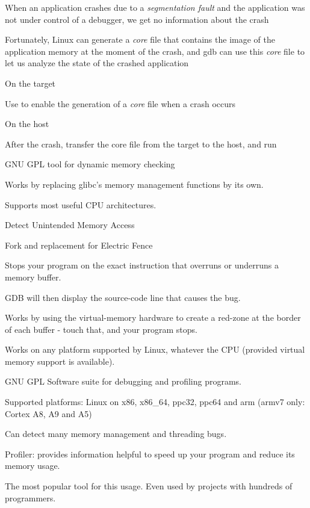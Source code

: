   \startitemize
  \item When an application crashes due to a {\em segmentation fault}
    and the application was not under control of a debugger, we get no
    information about the crash
  \item Fortunately, Linux can generate a {\em core} file that
    contains the image of the application memory at the moment of the
    crash, and gdb can use this {\em core} file to let us analyze the
    state of the crashed application
  \item On the target
    \startitemize
    \item Use  to enable the generation of a
      {\em core} file when a crash occurs
    \stopitemize
  \item On the host
    \startitemize
    \item After the crash, transfer the core file from the target to
      the host, and run
    \stopitemize
  \stopitemize


  \startitemize
  \item GNU GPL tool for dynamic memory checking
  \item Works by replacing glibc's memory management functions by its own.
  \item Supports most useful CPU architectures.
  \stopitemize

  Detect Unintended Memory Access\\
  \startitemize
  \item Fork and replacement for Electric Fence
  \item Stops your program on the exact instruction that overruns or
    underruns a  memory buffer.
  \item GDB will then display the source-code line that causes the
    bug.
  \item Works by using the virtual-memory hardware to create a
    red-zone at the border of each buffer - touch that, and your
    program stops.
  \item Works on any platform supported by Linux, whatever the CPU
    (provided virtual memory support is available).
  \stopitemize

    \startitemize
    \item GNU GPL Software suite for debugging and profiling programs.
    \item Supported platforms: Linux on x86, x86\_64, ppc32, ppc64 and
      arm (armv7 only: Cortex A8, A9 and A5)
    \item Can detect many memory management and threading bugs.
    \item Profiler: provides information helpful to speed up your
      program and reduce its memory usage.
    \item The most popular tool for this usage. Even used by projects
      with hundreds of programmers.
    \stopitemize

